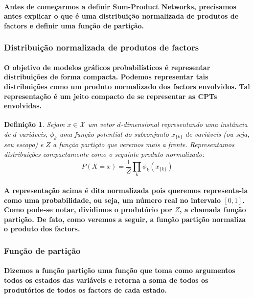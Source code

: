 \documentclass[a4paper,10pt]{article}
\theoremstyle{plain}
\newtheorem{spn-def}{Definição}
\begin{document}
\paragraph{
  Antes de começarmos a definir Sum-Product Networks, precisamos antes explicar o que é uma
  distribuição normalizada de produtos de factors e definir uma função de partição.
}

\subsubsection{Distribuição normalizada de produtos de factors}

\paragraph{
  O objetivo de modelos gráficos probabilísticos é representar distribuições de forma compacta.
  Podemos representar tais distribuições como um produto normalizado dos factors\cite{report-2}
  envolvidos. Tal representação é um jeito compacto de se representar as CPTs envolvidas.
}

\begin{spn-def} Sejam $x \in \mathcal{X}$ um vetor $d$-dimensional representando uma instância de
  $d$ variáveis, $\phi_k$ uma função potential\cite{report-2} do subconjunto $x_{\{k\}}$ de
  variáveis (ou seja, seu escopo\cite{project-def}) e $Z$ a função partição que veremos mais a
  frente. Representamos distribuições compactamente como o seguinte produto normalizado:
  \begin{equation}
    P(X = x) = \frac{1}{Z} \prod_k \phi_k (x_{\{k\}})
  \end{equation}
\end{spn-def}

\paragraph{
  A representação acima é dita normalizada pois queremos representa-la como uma probabilidade, ou
  seja, um número real no intervalo $[0, 1]$. Como pode-se notar, dividimos o produtório por $Z$,
  a chamada função partição. De fato, como veremos a seguir, a função partição normaliza o produto
  dos factors.
}

\subsubsection{Função de partição}

\paragraph{
  Dizemos a função partição uma função que toma como argumentos todos os estados das variáveis e
  retorna a soma de todos os produtórios de todos os factors de cada estado.
}
\end{document}
